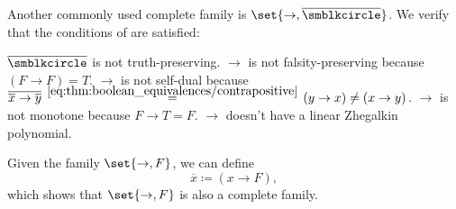\begin{example}
\begin{thmenum}
     Another commonly used complete family is \( \set{ \rightarrow, \overline{\placeholder} } \).
    We verify that the conditions of  are satisfied:
    \begin{refenum}
       \( \overline{\placeholder} \) is not truth-preserving.
       \( \rightarrow \) is not falsity-preserving because \( (F \rightarrow F) = T \).
       \( \rightarrow \) is not self-dual because \( \overline{\overline{x} \rightarrow \overline{y}} \reloset {\eqref{eq:thm:boolean_equivalences/contrapositive}} = (y \rightarrow x) \neq (x \rightarrow y) \).
       \( \rightarrow \) is not monotone because \( F \rightarrow T = F \).
       \( \rightarrow \) doesn't have a linear Zhegalkin polynomial.
    \end{refenum}

     Given the family \( \set{ \rightarrow, F } \), we can define
    \begin{equation*}
      \overline{x} \coloneqq (x \rightarrow F),
    \end{equation*}
    which shows that \( \set{ \rightarrow, F } \) is also a complete family.
  \end{thmenum}
\end{example}
